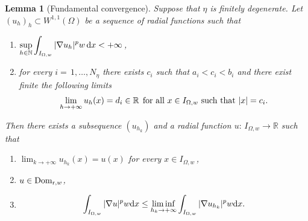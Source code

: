 \documentclass[11pt,leqno]{amsart}
\newtheorem{lem}[teo]{Lemma}
\theoremstyle{remark}
\theoremstyle{definition}
\theoremstyle{definition}
\newcommand{\bbR}{{\mathbb{R}}}
\newcommand{\bbN}{{\mathbb{N}}}
\def\de{{\rm d}}
\begin{document}
\begin{lem}[Fundamental convergence]\label {lemma2} 
Suppose that $\eta$ is finitely degenerate. Let $(u_h)_h\subset W^{1,1}(\Omega)$ be a sequence of radial functions such that
\begin{enumerate}
\item[(a)] $\displaystyle\sup_{h\in\bbN}\int_{I_{\Omega,w}}|\nabla u_h|^{p}w\,\de x<+\infty$\,,
\item[(b)] for every $i=\,1,\dots,N_\eta$ there exists $c_i$ such that $a_i< c_i<b_i$ and there exist finite the following limits
$$
\lim_{h\to+\infty}u_h(x)=d_i\in \bbR\, \hskip 0,1cm \text{for all $x\in I_{\Omega,w}$ such that $\vert x\vert=c_{i}$}.
$$
\end{enumerate}
Then there exists a subsequence $(u_{h_k})$ and a radial function 
$u:\,I_{\Omega,w}\to\bbR$ such that 
\begin{enumerate}
\item[(i)] $\displaystyle\lim_{k\to+\infty}u_{h_k}(x) =u(x) $ for every $x\in I_{\Omega,w}$\,,
\item[(ii)] $u\in {\rm{Dom}}_{{\mathrm r},w}$,
\item[(iii)]
\begin{align*}
\displaystyle\int_{I_{\Omega,w}}\vert \nabla u \vert^{p}w\de x\leq \liminf_{h_{k}\rightarrow +\infty}\displaystyle\int_{I_{\Omega,w}}\vert \nabla u_{h_{k}}\vert^{p}w\de x.
\end{align*}
\end{enumerate}
\end{lem}
\end{document}
